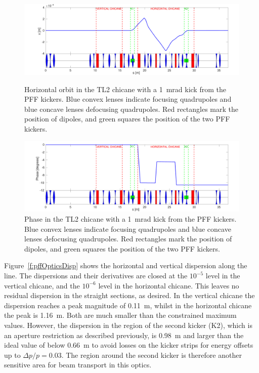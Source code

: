{\begin{landscape}
\begin{figure}
  \centering
  \includegraphics[width=0.75\hsize]{Figures/optics/pffOpticsX}
  \caption{Horizontal orbit in the TL2 chicane with a 1~mrad kick from the PFF kickers. Blue convex lenses indicate focusing quadrupoles and blue concave lenses defocusing quadrupoles. Red rectangles mark the position of dipoles, and green squares the position of the two PFF kickers.}
  \label{f:pffOpticsX}
  \includegraphics[width=0.75\hsize]{Figures/optics/pffOpticsPhase}
  \caption{Phase in the TL2 chicane with a 1~mrad kick from the PFF kickers. Blue convex lenses indicate focusing quadrupoles and blue concave lenses defocusing quadrupoles. Red rectangles mark the position of dipoles, and green squares the position of the two PFF kickers.}
  \label{f:pffOpticsPhase}
\end{figure}
\end{landscape}}

Figure~\ref{f:pffOpticsDisp} shows the horizontal and vertical dispersion along the line. The dispersions and their derivatives are closed at the \(10^{-5}\) level in the vertical chicane, and the \(10^{-6}\) level in the horizontal chicane. This leaves no residual dispersion in the straight sections, as desired. In the vertical chicane the dispersion reaches a peak magnitude of 0.11~m, whilst in the horizontal chicane the peak is 1.16~m. Both are much smaller than the constrained maximum values. However, the dispersion in the region of the second kicker (K2), which is an aperture restriction as described previously, is 0.98~m and larger than the ideal value of below \(0.66\)~m to avoid losses on the kicker strips for energy offsets up to \(\Delta p/p = 0.03\). The region around the second kicker is therefore another sensitive area for beam transport in this optics.

